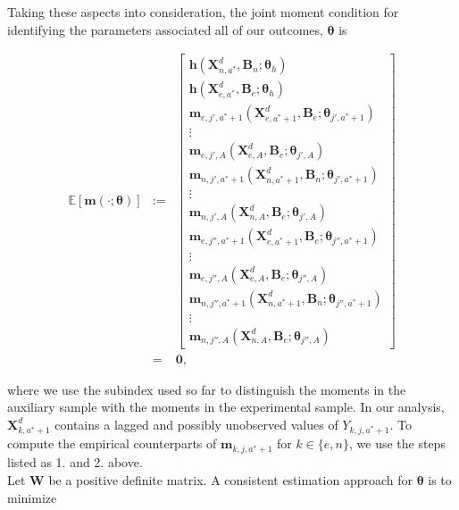 \noindent Taking these aspects into consideration, the joint moment condition for identifying the parameters associated all of our outcomes, $\bm{\theta}$ is 




\begin{eqnarray}
\mathbb{E} \left[ \bm{m} \left( \cdot ; \bm{\theta} \right) \right] &:=&
\begin{bmatrix}
 \mathbf{h} \left(  \bm{X}_{n,a^*}^d, \bm{B}_{n}; \bm{\theta}_{h}  \right) \\  \mathbf{h} \left(  \bm{X}_{e,a^*}^d, \bm{B}_{e}; \bm{\theta}_{h}  \right) \\
\bm{m}_{e,j',a^*+1} \left( \bm{X}_{e,a^*+1}^d, \bm{B}_{e}; \bm{\theta}_{j',a^*+1} \right) \\ \vdots \\  \bm{m}_{e,j',A} \left( \bm{X}_{e,A}^d, \bm{B}_{e}; \bm{\theta}_{j',A} \right) \\
\bm{m}_{n,j',a^*+1} \left( \bm{X}_{n,a^*+1}^d, \bm{B}_{n}; \bm{\theta}_{j',a^*+1} \right) \\ \vdots \\  \bm{m}_{n,j',A} \left( \bm{X}_{n,A}^d, \bm{B}_{e}; \bm{\theta}_{j',A} \right) \\
\bm{m}_{e,j'',a^*+1} \left( \bm{X}_{e,a^*+1}^d, \bm{B}_{e}; \bm{\theta}_{j'',a^*+1} \right) \\ \vdots \\  \bm{m}_{e,j'',A} \left( \bm{X}_{e,A}^d, \bm{B}_{e}; \bm{\theta}_{j'',A} \right) \\
\bm{m}_{n,j'',a^*+1} \left( \bm{X}_{n,a^*+1}^d, \bm{B}_{n}; \bm{\theta}_{j'',a^*+1} \right) \\ \vdots \\  \bm{m}_{n,j'',A} \left( \bm{X}_{n,A}^d, \bm{B}_{e}; \bm{\theta}_{j'',A} \right) 
 \label{eq:loss}
\end{bmatrix}  \\ \nonumber
&=& \bm{0}, \label{eq:MOMENT}
\end{eqnarray}

\noindent where we use the subindex used so far to distinguish the moments in the auxiliary sample with the moments in the experimental sample. In our analysis, $\bm{X}_{k,a^*+1}^d$ contains a lagged and possibly unobserved values of $Y_{k,j,a^*+1}$. To compute the empirical counterparts of $\bm{m}_{k,j,a^*+1}$ for $k \in \{e, n\}$, we use the steps listed as 1. and 2. above.\\

\noindent Let $\bm{W}$ be a positive definite matrix. A consistent estimation approach for $\bm{\theta}$ is to minimize 

